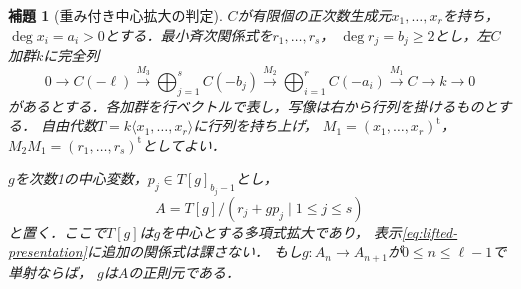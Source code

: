 \documentclass[11pt,a4paper]{ltjsarticle}
\newtheorem{lemma}[theorem]{補題}
\theoremstyle{definition}
\begin{document}
\begin{lemma}[重み付き中心拡大の判定]\label{lem:weighted-central-extension}
$C$が有限個の正次数生成元$x_1,\ldots,x_r$を持ち，
$\deg x_i=a_i>0$とする．最小斉次関係式を$r_1,\ldots,r_s$，
$\deg r_j=b_j\geq2$とし，左$C$加群$k$に完全列
\begin{equation}\label{eq:weighted-base-resolution}
0\longrightarrow C(-\ell)
 \xrightarrow{M_3}\bigoplus_{j=1}^{s}C(-b_j)
 \xrightarrow{M_2}\bigoplus_{i=1}^{r}C(-a_i)
 \xrightarrow{M_1}C\longrightarrow k\longrightarrow0
\end{equation}
があるとする．各加群を行ベクトルで表し，写像は右から行列を掛けるものとする．
自由代数$T=k\langle x_1,\ldots,x_r\rangle$に行列を持ち上げ，
$M_1=(x_1,\ldots,x_r)^{\mathrm t}$，
$M_2M_1=(r_1,\ldots,r_s)^{\mathrm t}$としてよい．

$g$を次数1の中心変数，$p_j\in T[g]_{b_j-1}$とし，
\begin{equation}\label{eq:lifted-presentation}
 A=T[g]/(r_j+gp_j\mid1\leq j\leq s)
\end{equation}
と置く．ここで$T[g]$は$g$を中心とする多項式拡大であり，
表示\eqref{eq:lifted-presentation}に追加の関係式は課さない．
もし$g:A_n\to A_{n+1}$が$0\leq n\leq\ell-1$で単射ならば，
$g$は$A$の正則元である．
\end{lemma}
\end{document}
